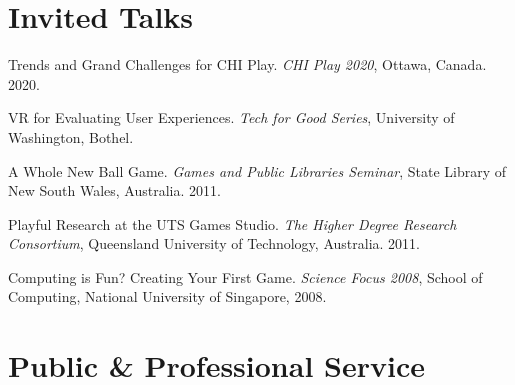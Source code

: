 \documentclass[10pt,a4paper]{article}
\renewenvironment{itemize}{
    \begin{list}{}{
            \setlength{\leftmargin}{1.5em}
            \setlength{\itemsep}{0.25em}
            \setlength{\parskip}{0pt}
            \setlength{\parsep}{0.25em}
        }
        }{
    \end{list}
}
\begin{document}
\printbibliography[title={Selected Publications}]



\section*{Invited Talks}

\begin{itemize}

    \item Trends and Grand Challenges for CHI Play.
        \textit{CHI Play 2020}, Ottawa, Canada.
        2020.

    \item VR for Evaluating User Experiences.
        \textit{Tech for Good Series}, University of Washington, Bothel. 

    \item A Whole New Ball Game.
        \textit{Games and Public Libraries Seminar}, State Library of New South Wales, Australia.
        2011.

    \item Playful Research at the UTS Games Studio.
        \textit{The Higher Degree Research Consortium}, Queensland University of Technology, Australia.
        2011.

    \item Computing is Fun? Creating Your First Game.
        \textit{Science Focus 2008}, School of Computing, National University of Singapore,
        2008.

\end{itemize}



\section*{Public \& Professional Service}
\end{document}
